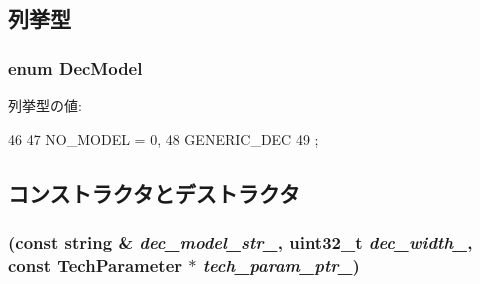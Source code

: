 \subsection{列挙型}
\hypertarget{classDecoderUnit_a3dfab203c31b5869c76011da4dfea555}{
\subsubsection[{DecModel}]{\setlength{\rightskip}{0pt plus 5cm}enum {\bf DecModel}}}
\label{classDecoderUnit_a3dfab203c31b5869c76011da4dfea555}
\begin{Desc}
\item[列挙型の値: ]\par
\begin{description}
\item[{\em 
\hypertarget{classDecoderUnit_a3dfab203c31b5869c76011da4dfea555abab57b6e2c553e4d983f415a1f4ea75b}{
NO\_\-MODEL}
\label{classDecoderUnit_a3dfab203c31b5869c76011da4dfea555abab57b6e2c553e4d983f415a1f4ea75b}
}]\item[{\em 
\hypertarget{classDecoderUnit_a3dfab203c31b5869c76011da4dfea555a09523c5db72a4b210833a2830b2805d8}{
GENERIC\_\-DEC}
\label{classDecoderUnit_a3dfab203c31b5869c76011da4dfea555a09523c5db72a4b210833a2830b2805d8}
}]\end{description}
\end{Desc}




\begin{DoxyCode}
46     {
47       NO_MODEL = 0,
48       GENERIC_DEC
49     };
\end{DoxyCode}


\subsection{コンストラクタとデストラクタ}
\hypertarget{classDecoderUnit_abacb41b8d8b2df0e3dd7aa011dd24a68}{
\subsubsection[{DecoderUnit}]{ (const string \& {\em dec\_\-model\_\-str\_\-}, \/  {\bf uint32\_\-t} {\em dec\_\-width\_\-}, \/  const {\bf TechParameter} $\ast$ {\em tech\_\-param\_\-ptr\_\-})}}
\label{classDecoderUnit_abacb41b8d8b2df0e3dd7aa011dd24a68}



